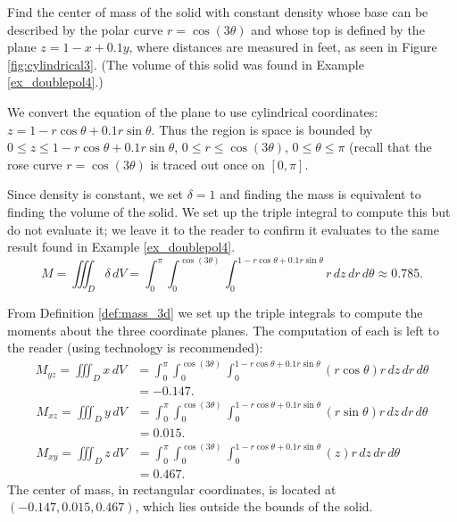 {Find the center of mass of the solid with constant density whose base can be described by the polar curve $r=\cos(3\theta)$ and whose top is defined by the plane $z=1-x+0.1y$, where distances are measured in feet, as seen in Figure \ref{fig:cylindrical3}. (The volume of this solid was found in Example \ref{ex_doublepol4}.)
}
{We convert the equation of the plane to use cylindrical coordinates: $z= 1-r\cos\theta+0.1r\sin\theta$. Thus the region is space is bounded by $0 \leq z \leq 1-r\cos\theta + 0.1r\sin\theta$, $0 \leq r \leq \cos(3\theta)$, $0 \leq \theta \leq \pi$ (recall that the rose curve $r=\cos(3\theta)$ is traced out once on $[0,\pi]$.

Since density is constant, we set $\delta = 1$ and finding the mass is equivalent to finding the volume of the solid. We set up the triple integral to compute this but do not evaluate it; we leave it to the reader to confirm it evaluates to the same result found in Example \ref{ex_doublepol4}.
$$M = \iiint_D\delta \, dV = \int_0^{\pi}\int_0^{\cos(3\theta)}\int_0^{1-r\cos\theta+0.1r\sin\theta} r\,dz\,dr\,d\theta \approx 0.785.$$

From Definition \ref{def:mass_3d} we set up the triple integrals to compute the moments about the three coordinate planes. The computation of each is left to the reader (using technology is recommended):
\begin{align*}
M_{yz} = \iiint_D x\,dV &= \int_0^{\pi}\int_0^{\cos(3\theta)}\int_0^{1-r\cos\theta+0.1r\sin\theta} (r\cos\theta) r\,dz\,dr\,d\theta\\
&= -0.147.
\end{align*}
\begin{align*}
M_{xz} = \iiint_D y\,dV &= \int_0^{\pi}\int_0^{\cos(3\theta)}\int_0^{1-r\cos\theta+0.1r\sin\theta} (r\sin\theta) r\,dz\,dr\,d\theta\\
&= 0.015.\\
M_{xy} = \iiint_D z\,dV &= \int_0^{\pi}\int_0^{\cos(3\theta)}\int_0^{1-r\cos\theta+0.1r\sin\theta} (z) r\,dz\,dr\,d\theta\\
 &= 0.467.
\end{align*}
The center of mass, in rectangular coordinates,  is located at $(-0.147,0.015,0.467)$, which lies outside the bounds of the solid.
}\\

